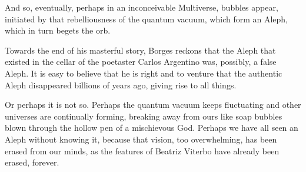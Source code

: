 \documentclass[11pt,a4paper]{article}
\begin{document}
And so, eventually, perhaps in an inconceivable Multiverse, bubbles appear, initiated by that rebelliousness of the quantum vacuum, which form an Aleph, which in turn begets the orb.

Towards the end of his masterful story, Borges reckons that the Aleph that existed in the cellar of the poetaster Carlos Argentino was, possibly, a false Aleph. It is easy to believe that he is right and to venture that the authentic Aleph disappeared billions of years ago, giving rise to all things.

Or perhaps it is not so. Perhaps the quantum vacuum keeps fluctuating and other universes are continually forming, breaking away from ours like soap bubbles blown through the hollow pen of a mischievous God. Perhaps we have all seen an Aleph without knowing it, because that vision, too overwhelming, has been erased from our minds, as the features of Beatriz Viterbo have already been erased, forever.
\end{document}
